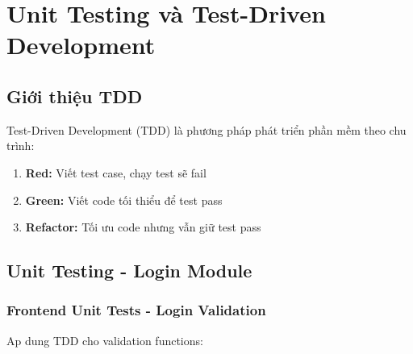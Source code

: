 ﻿\section{Unit Testing và Test-Driven Development}

\subsection{Giới thiệu TDD}
Test-Driven Development (TDD) là phương pháp phát triển phần mềm theo chu trình:
\begin{enumerate}
    \item \textbf{Red:} Viết test case, chạy test sẽ fail
    \item \textbf{Green:} Viết code tối thiểu để test pass
    \item \textbf{Refactor:} Tối ưu code nhưng vẫn giữ test pass
\end{enumerate}

\subsection{Unit Testing - Login Module}

\subsubsection{Frontend Unit Tests - Login Validation}
Ap dung TDD cho validation functions:

